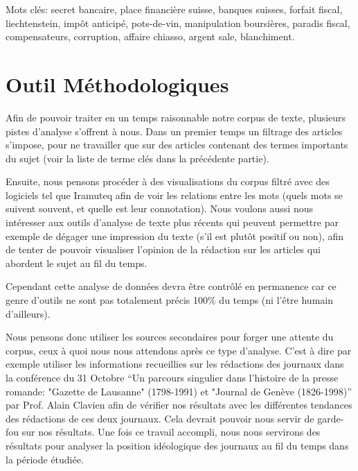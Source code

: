 \documentclass[ebook,9pt,oneside,openany]{memoir}
\begin{document}
Mots clés: secret bancaire, place financière suisse, banques suisses, forfait fiscal, liechtenstein, impôt anticipé, pots-de-vin, manipulation boursières, paradis fiscal, compensateurs, corruption, affaire chiasso, argent sale, blanchiment.

\section*{Outil Méthodologiques}
Afin de pouvoir traiter en un temps raisonnable notre corpus de texte, plusieurs pistes d’analyse s’offrent à nous. Dans un premier temps un filtrage des articles s’impose, pour ne travailler que sur des articles contenant des termes importants du sujet (voir la liste de terme clés dans la précédente partie).

    Ensuite, nous pensons procéder à des visualisations du corpus filtré avec des logiciels tel que Iramuteq afin de voir les relations entre les mots (quels mots se suivent souvent, et quelle est leur connotation). Nous voulons aussi nous intéresser aux outils d’analyse de texte plus récents qui peuvent permettre par exemple de dégager une impression du texte (s’il est plutôt positif ou non), afin de tenter de pouvoir visualiser l’opinion de la rédaction sur les articles qui abordent le sujet au fil du temps.
    
    Cependant cette analyse de données devra être contrôlé en permanence car ce genre d’outils ne sont pas totalement précis 100\% du temps (ni l’être humain d’ailleurs).
    
    Nous pensons donc utiliser les sources secondaires pour forger une attente du corpus, ceux à quoi nous nous attendons après ce type d’analyse. C’est à dire par exemple utiliser les informations recueillies sur les rédactions des journaux dans la conférence du 31 Octobre “Un parcours singulier dans l'histoire de la presse romande: "Gazette de Lausanne" (1798-1991) et "Journal de Genève (1826-1998)” par Prof. Alain Clavien afin de vérifier nos résultats avec les différentes tendances des rédactions de ces deux journaux. Cela devrait pouvoir nous servir de garde-fou sur nos résultats. Une fois ce travail accompli, nous nous servirons des résultats pour analyser la position idéologique des journaux au fil du temps dans la période étudiée.
\end{document}
